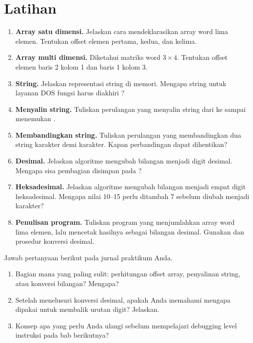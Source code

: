 \section{Latihan}
\label{sec:latihan-bab15}

\begin{enumerate}
    \item \textbf{Array satu dimensi.} Jelaskan cara mendeklarasikan
          array word lima elemen. Tentukan offset elemen pertama,
          kedua, dan kelima.

    \item \textbf{Array multi dimensi.} Diketahui matriks word
          $3 \times 4$. Tentukan offset elemen baris 2 kolom 1 dan
          baris 1 kolom 3.

    \item \textbf{String.} Jelaskan representasi string di memori.
          Mengapa string untuk layanan DOS fungsi  harus
          diakhiri ?

    \item \textbf{Menyalin string.} Tuliskan perulangan yang
          menyalin string dari  ke  sampai menemukan
          .

    \item \textbf{Membandingkan string.} Tuliskan perulangan yang
          membandingkan dua string karakter demi karakter. Kapan
          perbandingan dapat dihentikan?

    \item \textbf{Desimal.} Jelaskan algoritme mengubah bilangan
          menjadi digit desimal. Mengapa sisa pembagian disimpan
          pada ?

    \item \textbf{Heksadesimal.} Jelaskan algoritme mengubah
          bilangan menjadi empat digit heksadesimal. Mengapa nilai
          10--15 perlu ditambah 7 sebelum diubah menjadi karakter?

    \item \textbf{Penulisan program.} Tuliskan program yang
          menjumlahkan array word lima elemen, lalu mencetak hasilnya
          sebagai bilangan desimal. Gunakan  dan prosedur
          konversi desimal.
\end{enumerate}

\begin{refleksibox}
\vspace{1.1em}
Jawab pertanyaan berikut pada jurnal praktikum Anda.
\begin{enumerate}
    \item Bagian mana yang paling sulit: perhitungan offset array,
          penyalinan string, atau konversi bilangan? Mengapa?
    \item Setelah menelusuri konversi desimal, apakah Anda memahami
          mengapa  dipakai untuk membalik urutan digit?
          Jelaskan.
    \item Konsep apa yang perlu Anda ulangi sebelum mempelajari
          debugging level instruksi pada bab berikutnya?
\end{enumerate}
\end{refleksibox}
